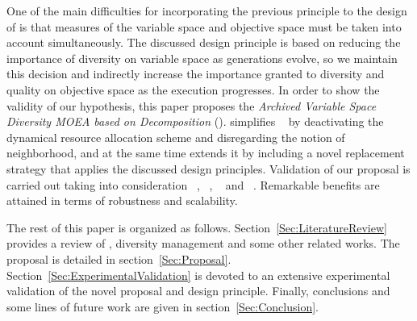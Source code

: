One of the main difficulties for incorporating the previous principle to the design of \MOEAS{} is that
measures of the variable space and objective space must be taken into account simultaneously.
%
The discussed design principle is based on reducing the importance of diversity on variable space as 
generations evolve, so we maintain this decision and indirectly increase the importance granted to diversity 
and quality on objective space as the execution progresses.
%
%
In order to show the validity of our hypothesis, this paper proposes the
\textit{Archived Variable Space Diversity MOEA based on Decomposition} (\AVSDMOEAD{}).
%
\AVSDMOEAD{} simplifies \MOEADDE{}~\cite{zhang2009performance} by deactivating the dynamical resource allocation
scheme and disregarding the notion of neighborhood,
and at the same
time extends it by including a novel replacement strategy that applies the discussed design principles.
%
Validation of our proposal is carried out taking into consideration 
\MOEADDE{}~\cite{zhang2009performance}, 
\NSGAII{}~\cite{deb2002fast}, 
\REMOA{}~\cite{trautmann2013r2} and 
\NSGAIII{}~\cite{deb2013evolutionary}.
%
Remarkable benefits are attained in terms of robustness and scalability.

The rest of this paper is organized as follows.
%
Section~\ref{Sec:LiteratureReview} provides a review of \MOEAS{}, diversity management 
and some other related works.
%
The \AVSDMOEAD{} proposal is detailed in section~\ref{Sec:Proposal}.
%
Section~\ref{Sec:ExperimentalValidation} is devoted to an extensive experimental validation of the novel proposal and
design principle.
%
Finally, conclusions and some lines of future work are given in section~\ref{Sec:Conclusion}.
%
